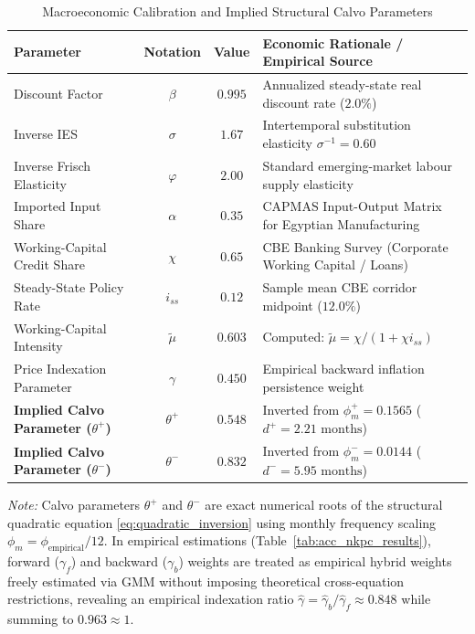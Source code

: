 \documentclass[review,12pt]{elsarticle}
\begin{document}
\begin{table}[htbp]
\centering
\small
\renewcommand{\arraystretch}{1.15}
\caption{Macroeconomic Calibration and Implied Structural Calvo Parameters}
\label{tab:calibration}
\begin{threeparttable}
\begin{tabularx}{\textwidth}{l c c L}
\toprule
\textbf{Parameter} & \textbf{Notation} & \textbf{Value} & \textbf{Economic Rationale / Empirical Source} \\
\midrule
Discount Factor & $\beta$ & $0.995$ & Annualized steady-state real discount rate ($2.0\%$) \\
Inverse IES & $\sigma$ & $1.67$ & Intertemporal substitution elasticity $\sigma^{-1} = 0.60$ \\
Inverse Frisch Elasticity & $\varphi$ & $2.00$ & Standard emerging-market labour supply elasticity \\
Imported Input Share & $\alpha$ & $0.35$ & CAPMAS Input-Output Matrix for Egyptian Manufacturing \\
Working-Capital Credit Share & $\chi$ & $0.65$ & CBE Banking Survey (Corporate Working Capital / Loans) \\
Steady-State Policy Rate & $i_{ss}$ & $0.12$ & Sample mean CBE corridor midpoint ($12.0\%$) \\
Working-Capital Intensity & $\tilde{\mu}$ & $0.603$ & Computed: $\tilde{\mu} = \chi / (1 + \chi i_{ss})$ \\
Price Indexation Parameter & $\gamma$ & $0.450$ & Empirical backward inflation persistence weight \\
\midrule
\textbf{Implied Calvo Parameter ($\theta^+$)} & $\theta^+$ & $\mathbf{0.548}$ & Inverted from $\phi_m^+ = 0.1565$ ($d^+ = 2.21\text{ months}$) \\
\textbf{Implied Calvo Parameter ($\theta^-$)} & $\theta^-$ & $\mathbf{0.832}$ & Inverted from $\phi_m^- = 0.0144$ ($d^- = 5.95\text{ months}$) \\
\bottomrule
\end{tabularx}
\begin{tablenotes}
\footnotesize
\item \textit{Note:} Calvo parameters $\theta^+$ and $\theta^-$ are exact numerical roots of the structural quadratic equation \eqref{eq:quadratic_inversion} using monthly frequency scaling $\phi_m = \phi_{\text{empirical}} / 12$. In empirical estimations (Table~\ref{tab:acc_nkpc_results}), forward ($\gamma_f$) and backward ($\gamma_b$) weights are treated as empirical hybrid weights freely estimated via GMM without imposing theoretical cross-equation restrictions, revealing an empirical indexation ratio $\hat{\gamma} = \hat{\gamma}_b / \hat{\gamma}_f \approx 0.848$ while summing to $0.963 \approx 1$.
\end{tablenotes}
\end{threeparttable}
\end{table}
\end{document}
